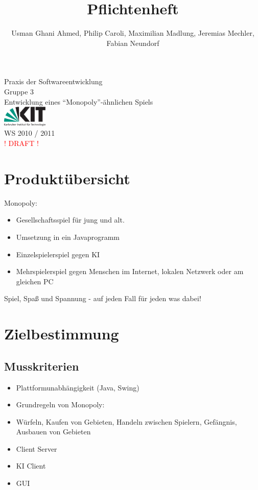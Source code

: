 \documentclass[a4paper,10pt]{article}
\title{Pflichtenheft}
\date{}
\author{Usman Ghani Ahmed, Philip Caroli, Maximilian Madlung, Jeremias Mechler, Fabian Neundorf}
\begin{document}
\maketitle
\begin{center}
\huge{Praxis der Softwareentwicklung \\
Gruppe 3 \\[0.5cm]
Entwicklung eines ``Monopoly''-ähnlichen Spiels \\[0.5cm]
\includegraphics[height=1cm]{kitlogo_de_rgb}  \\[0.5cm]
WS 2010 / 2011} \\[2cm]
\textcolor{red}{! DRAFT !}
\end{center}

\newpage

\tableofcontents

\newpage

\section{Produktübersicht}
Monopoly:
\begin{itemize}
\item Gesellschaftsspiel für jung und alt.
\item Umsetzung in ein Javaprogramm
\item Einzelspielerspiel gegen KI
\item Mehrspielerspiel gegen Menschen im Internet, lokalen Netzwerk oder am gleichen PC
\end{itemize}
Spiel, Spaß und Spannung - auf jeden Fall für jeden was dabei!
\section{Zielbestimmung}
\subsection{Musskriterien}
\begin{itemize}
\item Plattformunabhängigkeit (Java, Swing)
\item Grundregeln von Monopoly:
\item Würfeln, Kaufen von Gebieten, Handeln zwischen Spielern, Gefängnis, Ausbauen von Gebieten
\item Client Server
\item KI Client
\item GUI
\end{itemize}
\end{document}
